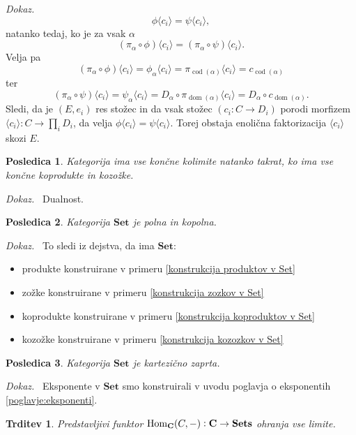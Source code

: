 \documentclass[12pt,a4paper]{book}
\theoremstyle{definition}
\theoremstyle{plain}
\newtheorem{trditev}[definicija]{Trditev}
\newtheorem{posledica}{Posledica}[definicija]
\newenvironment{dokaz}{\emph{Dokaz.}\ }{\hspace{\fill}{$\Box$}}
\theoremstyle{definition}
\theoremstyle{remark}
\newcommand{\cat}[1]{\textbf{#1}}
\DeclareMathOperator{\Hom}{Hom}
\DeclareMathOperator{\dom}{dom}
\DeclareMathOperator{\cod}{cod}
\begin{document}
\begin{dokaz}
$$\phi \langle c_i \rangle = \psi \langle c_i \rangle,$$
natanko tedaj, ko je za vsak $\alpha$
$$(\pi_\alpha \circ \phi) \langle c_i \rangle = (\pi_\alpha \circ \psi) \langle c_i \rangle.$$
Velja pa
$$(\pi_\alpha \circ \phi) \langle c_i \rangle = \phi_\alpha \langle c_i \rangle = \pi_{\cod(\alpha)}\langle c_i \rangle = c_{\cod(\alpha)} $$
ter
$$(\pi_\alpha \circ \psi) \langle c_i \rangle = \psi_\alpha \langle c_i \rangle  = D_\alpha \circ \pi_{\dom(\alpha)} \langle c_i \rangle = D_\alpha \circ c_{\dom(\alpha)}.$$
Sledi, da je $(E, e_i)$ res stožec in da vsak stožec $(c_i : C \to D_i)$ porodi morfizem $\langle c_i \rangle : C \to \prod_i D_i$, da velja $\phi\langle c_i \rangle = \psi \langle c_i \rangle$. Torej obstaja enolična faktorizacija $\langle c_i \rangle$ skozi $E$.
\end{dokaz}

\begin{posledica}
Kategorija ima vse končne kolimite natanko takrat, ko ima vse končne koprodukte in kozožke.
\end{posledica}
\begin{dokaz}
Dualnost.
\end{dokaz}

\begin{posledica}
Kategorija $\cat{Set}$ je polna in kopolna.
\end{posledica}
\begin{dokaz}
To sledi iz dejstva, da ima $\cat{Set}$:
\begin{itemize}
\item produkte konstruirane v primeru \ref{konstrukcija produktov v Set}
\item zožke konstruirane v primeru \ref{konstrukcija zozkov v Set}
\item koprodukte konstruirane v primeru \ref{konstrukcija koproduktov v Set}
\item kozožke konstruirane v primeru \ref{konstrukcija kozozkov v Set}
\end{itemize}
\end{dokaz}

\begin{posledica}
Kategorija $\cat{Set}$ je kartezično zaprta.
\end{posledica}
\begin{dokaz}
Eksponente v $\cat{Set}$ smo konstruirali v uvodu poglavja o eksponentih \autoref{poglavje:eksponenti}.
\end{dokaz}
 
\begin{trditev} Predstavljivi funktor $\Hom_{\bf{C}}(C,-): \bf{C} \to \bf{Sets}$ ohranja vse limite.
\end{trditev}
\end{document}
